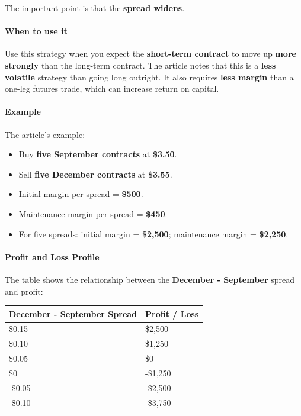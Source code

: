 \documentclass[12pt,openany]{book}
\begin{document}
The important point is that the \textbf{spread widens}.

\paragraph{When to use it}

Use this strategy when you expect the \textbf{short-term contract} to move up \textbf{more strongly} than the long-term contract. The article notes that this is a \textbf{less volatile} strategy than going long outright. It also requires \textbf{less margin} than a one-leg futures trade, which can increase return on capital.

\paragraph{Example}

The article's example:

\begin{itemize}[leftmargin=*]
    \item Buy \textbf{five September contracts} at \textbf{\$3.50}.
    \item Sell \textbf{five December contracts} at \textbf{\$3.55}.
    \item Initial margin per spread = \textbf{\$500}.
    \item Maintenance margin per spread = \textbf{\$450}.
    \item For five spreads: initial margin = \textbf{\$2,500}; maintenance margin = \textbf{\$2,250}.
\end{itemize}

\paragraph{Profit and Loss Profile}

The table shows the relationship between the \textbf{December - September} spread and profit:

\begin{center}
\small
\begin{tabular}{|L{0.34\textwidth}|L{0.28\textwidth}|}
\hline
\textbf{December - September Spread} & \textbf{Profit / Loss} \\ \hline
\$0.15 & \$2,500 \\ \hline
\$0.10 & \$1,250 \\ \hline
\$0.05 & \$0 \\ \hline
\$0 & -\$1,250 \\ \hline
-\$0.05 & -\$2,500 \\ \hline
-\$0.10 & -\$3,750 \\ \hline
\end{tabular}
\end{center}
\end{document}

